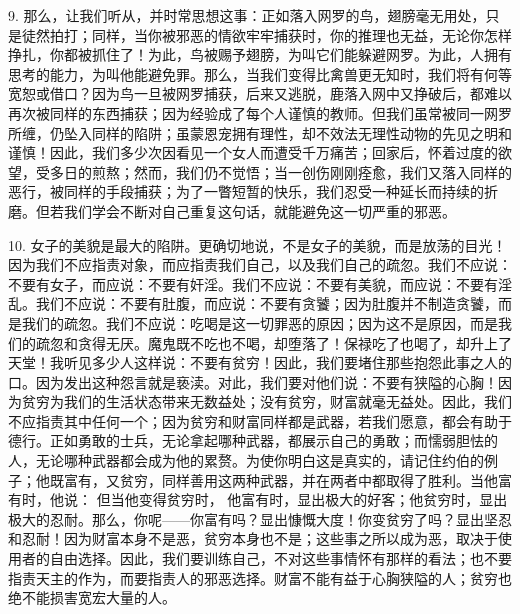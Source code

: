 9. 那么，让我们听从，并时常思想这事：正如落入网罗的鸟，翅膀毫无用处，只是徒然拍打；同样，当你被邪恶的情欲牢牢捕获时，你的推理也无益，无论你怎样挣扎，你都被抓住了！为此，鸟被赐予翅膀，为叫它们能躲避网罗。为此，人拥有思考的能力，为叫他能避免罪。那么，当我们变得比禽兽更无知时，我们将有何等宽恕或借口？因为鸟一旦被网罗捕获，后来又逃脱，鹿落入网中又挣破后，都难以再次被同样的东西捕获；因为经验成了每个人谨慎的教师。但我们虽常被同一网罗所缠，仍坠入同样的陷阱；虽蒙恩宠拥有理性，却不效法无理性动物的先见之明和谨慎！因此，我们多少次因看见一个女人而遭受千万痛苦；回家后，怀着过度的欲望，受多日的煎熬；然而，我们仍不觉悟；当一创伤刚刚痊愈，我们又落入同样的恶行，被同样的手段捕获；为了一瞥短暂的快乐，我们忍受一种延长而持续的折磨。但若我们学会不断对自己重复这句话，就能避免这一切严重的邪恶。\par

10. 女子的美貌是最大的陷阱。更确切地说，不是女子的美貌，而是放荡的目光！因为我们不应指责对象，而应指责我们自己，以及我们自己的疏忽。我们不应说：不要有女子，而应说：不要有奸淫。我们不应说：不要有美貌，而应说：不要有淫乱。我们不应说：不要有肚腹，而应说：不要有贪饕；因为肚腹并不制造贪饕，而是我们的疏忽。我们不应说：吃喝是这一切罪恶的原因；因为这不是原因，而是我们的疏忽和贪得无厌。魔鬼既不吃也不喝，却堕落了！保禄吃了也喝了，却升上了天堂！我听见多少人这样说：不要有贫穷！因此，我们要堵住那些抱怨此事之人的口。因为发出这种怨言就是亵渎。对此，我们要对他们说：不要有狭隘的心胸！因为贫穷为我们的生活状态带来无数益处；没有贫穷，财富就毫无益处。因此，我们不应指责其中任何一个；因为贫穷和财富同样都是武器，若我们愿意，都会有助于德行。正如勇敢的士兵，无论拿起哪种武器，都展示自己的勇敢；而懦弱胆怯的人，无论哪种武器都会成为他的累赘。为使你明白这是真实的，请记住约伯的例子；他既富有，又贫穷，同样善用这两种武器，并在两者中都取得了胜利。当他富有时，他说： 但当他变得贫穷时， 他富有时，显出极大的好客；他贫穷时，显出极大的忍耐。那么，你呢——你富有吗？显出慷慨大度！你变贫穷了吗？显出坚忍和忍耐！因为财富本身不是恶，贫穷本身也不是；这些事之所以成为恶，取决于使用者的自由选择。因此，我们要训练自己，不对这些事情怀有那样的看法；也不要指责天主的作为，而要指责人的邪恶选择。财富不能有益于心胸狭隘的人；贫穷也绝不能损害宽宏大量的人。\par

